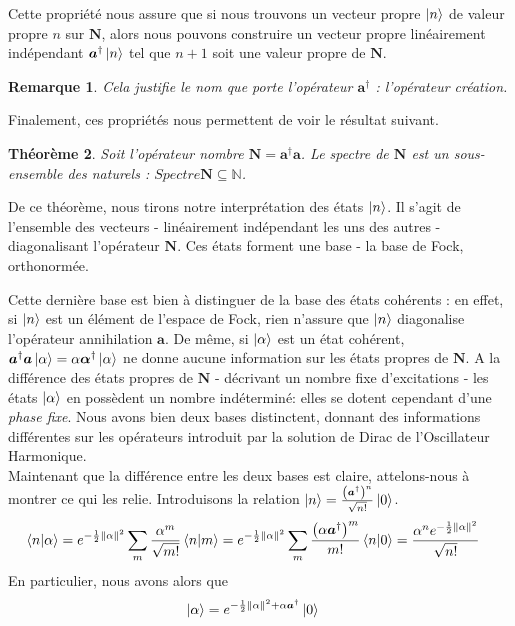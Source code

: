 \documentclass[11pt,oneside,a4paper]{article}
\newtheorem{theorem}{Théorème}[section]
\newtheorem{remark}[theorem]{Remarque}
\begin{document}
Cette propriété nous assure que si nous trouvons un vecteur propre $\ket{n}$ de valeur propre $n$ sur $\bm{N}$, alors nous pouvons construire un vecteur propre linéairement indépendant $\bm{a}^\dagger\ket{n}$ tel que $n+1$ soit une valeur propre de $\bm{N}$.
\begin{remark}
  Cela justifie le nom que porte l'opérateur $\bm{a}^\dagger$ : l'opérateur création.
\end{remark}
Finalement, ces propriétés nous permettent de voir le résultat suivant.
\begin{theorem}
  Soit l'opérateur nombre $\bm{N} = \bm{a}^\dagger\bm{a}$. Le spectre de $\bm{N}$ est un sous-ensemble des naturels : $Spectre \bm{N}\subseteq\mathbb{N}$.
\end{theorem}

De ce théorème, nous tirons notre interprétation des états $\ket{n}$. Il s'agit de l'ensemble des vecteurs - linéairement indépendant les uns des autres - diagonalisant l'opérateur $\bm{N}$. Ces états forment une base - la base de Fock, orthonormée. 

Cette dernière base est bien à distinguer de la base des états cohérents : en effet, si $\ket{n}$ est un élément de l'espace de Fock, rien n'assure que $\ket{n}$ diagonalise l'opérateur annihilation $\bm{a}$. De même, si $\ket{\alpha}$ est un état cohérent, $\bm{a}^\dagger \bm{a}\ket{\alpha} = \alpha \bm{\alpha}^\dagger\ket{\alpha}$ ne donne aucune information sur les états propres de $\bm{N}$. A la différence des états propres de $\bm{N}$ - décrivant un nombre fixe d'excitations - les états $\ket{\alpha}$ en possèdent un nombre indéterminé: elles se dotent cependant d'une \emph{phase fixe}. Nous avons bien deux bases distinctent, donnant des informations différentes sur les opérateurs introduit par la solution de Dirac de l'Oscillateur Harmonique.\\

Maintenant que la différence entre les deux bases est claire, attelons-nous à montrer ce qui les relie. Introduisons la relation $\ket{n} = \frac{\left(\bm{a}^\dagger\right)^n}{\sqrt{n!}}\ket{0}$. 
\begin{align}
  \braket{n}{\alpha} &= e^{-\frac{1}{2}\norm{\alpha}^2} \sum_m \frac{\alpha^m}{\sqrt{m!}}\braket{n}{m}
  = e^{-\frac{1}{2}\norm{\alpha}^2} \sum_m \frac{\left(\alpha\bm{a}^\dagger\right)^m}{m!}\braket{n}{0} = \frac{\alpha^ne^{-\frac{1}{2}\norm{\alpha}^2}}{\sqrt{n!}}
\end{align}
En particulier, nous avons alors que
\begin{align}
  \label{Création à partir du vide}
  \ket{\alpha} &= e^{-\frac{1}{2}\norm{\alpha}^2+\alpha\bm{a}^\dagger}\ket{0}
\end{align}
\end{document}

